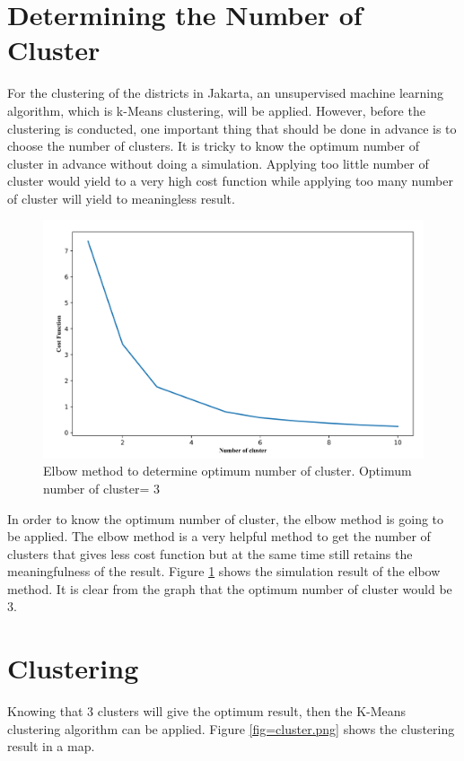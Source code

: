 \section{Determining the Number of Cluster}
For the clustering of the districts in Jakarta, an unsupervised machine learning algorithm, which is k-Means clustering, will be applied. However, before the clustering is conducted, one important thing that should be done in advance is to choose the number of clusters. It is tricky to know the optimum number of cluster in advance without doing a simulation. Applying too little number of cluster would yield to a very high cost function while applying too many number of cluster will yield to meaningless result.\\

\begin{figure}
\begin{center}
\graphicspath{ {./Pict/} }
\includegraphics[scale=0.15]{kcluster.png}
\caption{Elbow method to determine optimum number of cluster. Optimum number of cluster= 3}\label{fig=kcluster.png}
\end{center}
\end{figure}

\noindent
In order to know the optimum number of cluster, the elbow method is going to be applied. The elbow method is a very helpful method to get the number of clusters that gives less cost function but at the same time still retains the meaningfulness of the result. Figure \ref{fig=kcluster.png} shows the simulation result of the elbow method. It is clear from the graph that the optimum number of cluster would be 3.

\section{Clustering}
Knowing that 3 clusters will give the optimum result, then the K-Means clustering algorithm can be applied. Figure \ref{fig=cluster.png} shows the clustering result in a map. \\

